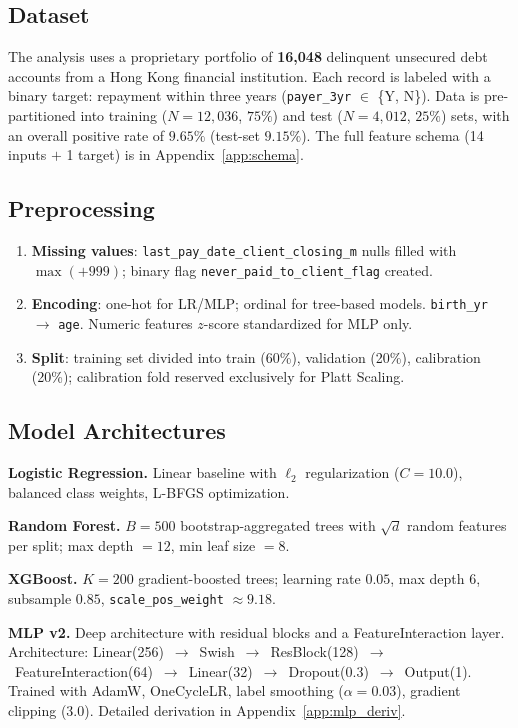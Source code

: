\documentclass[11pt, a4paper]{article}
\begin{document}
\subsection{Dataset}

The analysis uses a proprietary portfolio of \textbf{16,048} delinquent unsecured debt accounts from a Hong Kong financial institution. Each record is labeled with a binary target: repayment within three years (\texttt{payer\_3yr} $\in$ \{Y, N\}). Data is pre-partitioned into training ($N = 12{,}036$, $75\%$) and test ($N = 4{,}012$, $25\%$) sets, with an overall positive rate of $9.65\%$ (test-set $9.15\%$). The full feature schema (14 inputs $+$ 1 target) is in Appendix~\ref{app:schema}.

\subsection{Preprocessing}

\begin{enumerate}[label=(\roman*), nosep]
    \item \textbf{Missing values}: \texttt{last\_pay\_date\_client\_closing\_m} nulls filled with $\max(+999)$; binary flag \texttt{never\_paid\_to\_client\_flag} created.
    \item \textbf{Encoding}: one-hot for LR/MLP; ordinal for tree-based models. \texttt{birth\_yr} $\rightarrow$ \texttt{age}. Numeric features $z$-score standardized for MLP only.
    \item \textbf{Split}: training set divided into train (60\%), validation (20\%), calibration (20\%); calibration fold reserved exclusively for Platt Scaling.
\end{enumerate}

\subsection{Model Architectures}

\textbf{Logistic Regression.} Linear baseline with $\ell_2$ regularization ($C=10.0$), balanced class weights, L-BFGS optimization.

\textbf{Random Forest.} $B=500$ bootstrap-aggregated trees with $\sqrt{d}$ random features per split; max depth $=12$, min leaf size $=8$.

\textbf{XGBoost.} $K=200$ gradient-boosted trees; learning rate $0.05$, max depth $6$, subsample $0.85$, \texttt{scale\_pos\_weight} ${\approx}9.18$.

\textbf{MLP v2.} Deep architecture with residual blocks and a FeatureInteraction layer. Architecture: Linear(256)~$\to$~Swish~$\to$~ResBlock(128)~$\to$~FeatureInteraction(64)~$\to$~Linear(32)~$\to$~Dropout(0.3)~$\to$~Output(1). Trained with AdamW, OneCycleLR, label smoothing ($\alpha=0.03$), gradient clipping (3.0). Detailed derivation in Appendix~\ref{app:mlp_deriv}.
\end{document}
